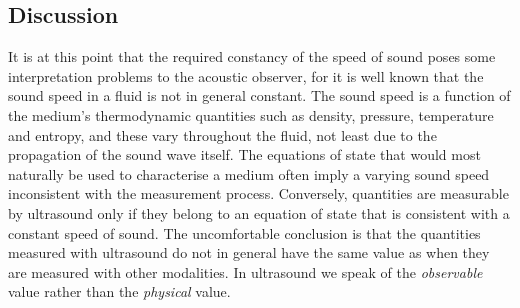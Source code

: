 





\subsection{Discussion}


It is at this point that the required constancy of the speed of sound poses some interpretation problems to the acoustic observer,
for it is well known that the sound speed in a fluid is not in general constant.
The sound speed is a function of the medium's thermodynamic quantities such as  density, pressure, temperature and entropy,
and these vary throughout the fluid, not least due to the propagation of the sound wave itself.
The equations of state that would most naturally be used to characterise a medium often imply a varying sound speed inconsistent with the measurement process.
Conversely, quantities are measurable by ultrasound only if they belong to an equation of state that is consistent with a constant speed of sound.
The uncomfortable conclusion is that the quantities measured with ultrasound do not in general have the same value as when they are measured with other modalities.
In ultrasound we speak of the  {\em observable} value rather than the {\em physical} value.



